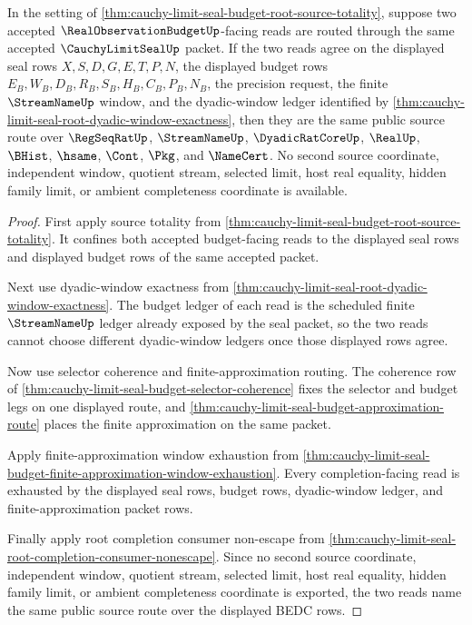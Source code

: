 \begin{theorem}
\label{thm:cauchy-limit-seal-budget-source-uniqueness}
In the setting of \autoref{thm:cauchy-limit-seal-budget-root-source-totality}, suppose two accepted $\RealObservationBudgetUp$-facing reads are routed through the same accepted $\CauchyLimitSealUp$ packet. If the two reads agree on the displayed seal rows $X,S,D,G,E,T,P,N$, the displayed budget rows $E_B,W_B,D_B,R_B,S_B,H_B,C_B,P_B,N_B$, the precision request, the finite $\StreamNameUp$ window, and the dyadic-window ledger identified by \autoref{thm:cauchy-limit-seal-root-dyadic-window-exactness}, then they are the same public source route over $\RegSeqRatUp$, $\StreamNameUp$, $\DyadicRatCoreUp$, $\RealUp$, $\BHist$, $\hsame$, $\Cont$, $\Pkg$, and $\NameCert$. No second source coordinate, independent window, quotient stream, selected limit, host real equality, hidden family limit, or ambient completeness coordinate is available.
\end{theorem}
\begin{proof}
First apply source totality from \autoref{thm:cauchy-limit-seal-budget-root-source-totality}. It confines both accepted budget-facing reads to the displayed seal rows and displayed budget rows of the same accepted packet.

Next use dyadic-window exactness from \autoref{thm:cauchy-limit-seal-root-dyadic-window-exactness}. The budget ledger of each read is the scheduled finite $\StreamNameUp$ ledger already exposed by the seal packet, so the two reads cannot choose different dyadic-window ledgers once those displayed rows agree.

Now use selector coherence and finite-approximation routing. The coherence row of \autoref{thm:cauchy-limit-seal-budget-selector-coherence} fixes the selector and budget legs on one displayed route, and \autoref{thm:cauchy-limit-seal-budget-approximation-route} places the finite approximation on the same packet.

Apply finite-approximation window exhaustion from \autoref{thm:cauchy-limit-seal-budget-finite-approximation-window-exhaustion}. Every completion-facing read is exhausted by the displayed seal rows, budget rows, dyadic-window ledger, and finite-approximation packet rows.

Finally apply root completion consumer non-escape from \autoref{thm:cauchy-limit-seal-root-completion-consumer-nonescape}. Since no second source coordinate, independent window, quotient stream, selected limit, host real equality, hidden family limit, or ambient completeness coordinate is exported, the two reads name the same public source route over the displayed BEDC rows.
\end{proof}


